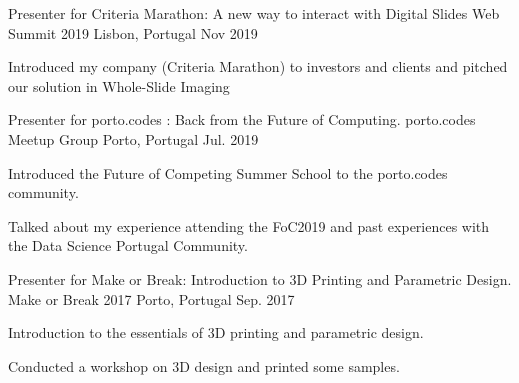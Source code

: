 

\begin{cventries}



  \cventry
   {Presenter for Criteria Marathon: A new way to interact with Digital Slides} %
   {Web Summit 2019} %
   {Lisbon, Portugal} %
   {Nov 2019} %
   {
     \begin{cvitems} %
       \item {Introduced my company (Criteria Marathon) to investors and clients and pitched our solution in Whole-Slide Imaging}
     \end{cvitems}
   }

  \cventry
    {Presenter for porto.codes : Back from the Future of Computing.} %
    {porto.codes Meetup Group} %
    {Porto, Portugal} %
    {Jul. 2019} %
    {
      \begin{cvitems} %
        \item {Introduced the Future of Competing Summer School to the porto.codes community.}
        \item {Talked about  my experience attending the FoC2019 and past experiences with the Data Science Portugal Community.}
      \end{cvitems}
    }


  \cventry
    {Presenter for Make or Break: Introduction to 3D Printing and Parametric Design.} %
    {Make or Break 2017} %
    {Porto, Portugal} %
    {Sep. 2017} %
    {
      \begin{cvitems} %
        \item {Introduction to the essentials of 3D printing and parametric design.}
	\item {Conducted a workshop on 3D design and printed some samples.}	
      \end{cvitems}
    }


\end{cventries}
